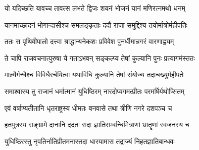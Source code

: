 \twolineshloka
{यो यदिच्छति यावच्च तावत्स लभते द्विजः}
{शयनं भोजनं यानं मणिरत्नमथो धनम्}


\twolineshloka
{यानमाच्छादनं भोगान्दासीश्च समलङ्कृताः}
{ददौ राजा समुद्दिश्य तयोर्मात्रोर्महीपतिः}


\twolineshloka
{ततः स पृथिवीपालो दत्त्वा श्राद्धान्यनेकशः}
{प्रविवेश पुनर्धीमान्नगरं वारणाह्वयम्}


\twolineshloka
{ते चापि राजवचनात्पुरुषा ये गताऽभवन्}
{सङ्कल्प्य तेषां कुल्यानि पुनः प्रत्यागमंस्ततः}


\twolineshloka
{माल्यैर्गन्धैश्च विविधैरर्चयित्वा यथाविधि}
{कुल्यानि तेषां संयोज्य तदाचख्युर्महीपतेः}


\twolineshloka
{समाश्वास्य तु राजानं धर्मात्मानं युधिष्ठिरम्}
{नारदोप्यगमत्प्रीतः परमर्षिर्यथोप्सितम्}


\twolineshloka
{एवं वर्षाण्यतीतानि धृतराष्ट्रस्य धीमतः}
{वनवासे तथा त्रीणि नगरे दशपञ्च च}


\twolineshloka
{हतपुत्रस्य सङ्ग्रामे दानानि ददतः सदा}
{ज्ञातिसम्बन्धिमित्राणां भ्रातॄणां स्वजनस्य च}


\twolineshloka
{युधिष्ठिरस्तु नृपतिर्नातिप्रीतमनास्तदा}
{धारयामास तद्राज्यं निहतज्ञातिबान्धवः}


